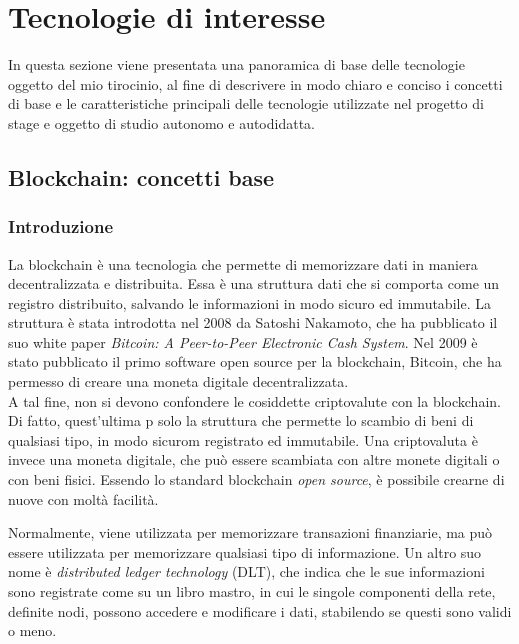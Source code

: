 \chapter{Tecnologie di interesse}\label{cap:tecnologie}

In questa sezione viene presentata una panoramica di base delle tecnologie oggetto del mio tirocinio,
al fine di descrivere in modo chiaro e conciso i concetti di base e le caratteristiche principali delle tecnologie
utilizzate nel progetto di stage e oggetto di studio autonomo e autodidatta.

\section{Blockchain: concetti base}\label{sec:tecnologie-blockchain}

\subsection{Introduzione}\label{sec:tecnologie-blockchain-introduzione}

La blockchain è una tecnologia che permette di memorizzare dati in maniera decentralizzata e distribuita.
Essa è una struttura dati che si comporta come un registro distribuito, salvando le informazioni in modo sicuro ed immutabile.
La struttura è stata introdotta nel 2008 da Satoshi Nakamoto, che ha pubblicato il suo white paper \textit{Bitcoin: A Peer-to-Peer Electronic Cash System}.
Nel 2009 è stato pubblicato il primo software open source per la blockchain, Bitcoin, che ha permesso di creare una moneta digitale decentralizzata. \\

A tal fine, non si devono confondere le cosiddette criptovalute con la blockchain. Di fatto, quest'ultima p solo la struttura che permette lo scambio di beni di qualsiasi tipo,
in modo sicurom registrato ed immutabile. Una criptovaluta è invece una moneta digitale, che può essere scambiata con altre monete digitali o con beni fisici.
Essendo lo standard blockchain \textit{open source}, è possibile crearne di nuove con moltà facilità.

Normalmente, viene utilizzata per memorizzare transazioni finanziarie, ma può essere utilizzata per memorizzare qualsiasi tipo di informazione.
Un altro suo nome è \textit{distributed ledger technology} (DLT), che indica che le sue informazioni sono registrate come su un libro mastro, in cui le singole componenti della rete,
definite nodi, possono accedere e modificare i dati, stabilendo se questi sono validi o meno.

